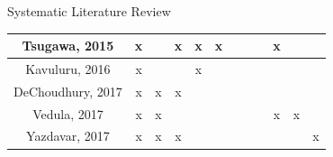 \documentclass[aspectratio=169,10pt,xcolor={dvipsnames}]{beamer}
\begin{document}
\begin{frame}{Systematic Literature Review}
\begin{table}[]
{\begin{tabular}{c|c|c|c|c|c|c|ccc|c|c}
    Tsugawa, 2015 \cite{Tsugawa2015}                              & x                                                               &                   & x              & x              & x                                                                   &                       & \multicolumn{1}{c|}{}                  & \multicolumn{1}{c|}{}                                                               & x             &                                                                  &                                                                         \\ \hline
    Kavuluru, 2016 \cite{Kavuluru:2016:CHC:2975167.2975170}       & x                                                               &                   &                & x              &                                                                     &                       & \multicolumn{1}{c|}{}                  & \multicolumn{1}{c|}{}                                                               &               &                                                                  &                                                                         \\ \hline
    DeChoudhury, 2017 \cite{DeChoudhury:2017:GCD:2998181.2998220} & x                                                               & x                 & x              &                &                                                                     &                       & \multicolumn{1}{c|}{}                  & \multicolumn{1}{c|}{}                                                               &               &                                                                  &                                                                         \\ \hline
    Vedula, 2017 \cite{Vedula2017}                                & x                                                               & x                 &                &                &                                                                     &                       & \multicolumn{1}{c|}{}                  & \multicolumn{1}{c|}{}                                                               & x             & x                                                                &                                                                         \\ \hline
    Yazdavar, 2017 \cite{Yazdavar:2017:SAM:3110025.3123028}       & x                                                               & x                 & x              &                &                                                                     &                       & \multicolumn{1}{c|}{}                  & \multicolumn{1}{c|}{}                                                               &               &                                                                  & x                                                                       \\ \hline

\end{tabular}}
\end{table}
\end{frame}
\end{document}
